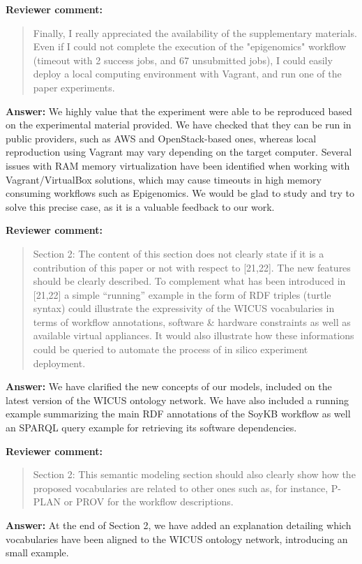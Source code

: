 \documentclass{letter}
\newenvironment{review}%
{\textbf{Reviewer comment:}\begin{quote}}%
{\end{quote}}%
\newcommand{\todo}[1]{%
      \color{red}\textbf{[TODO]} #1\color{black}}
\newcommand{\answer}[1]{%
      \textbf{Answer:} #1}
\begin{document}
\begin{letter}{}
\begin{review}
Finally, I really appreciated the availability of the supplementary materials. Even if I could not complete the execution of the "epigenomics" workflow (timeout with 2 success jobs, and 67 unsubmitted jobs), I could easily deploy a local computing environment with Vagrant, and run one of the paper experiments.
\end{review}

\answer{We highly value that the experiment were able to be reproduced based on the experimental material provided. We have checked that they can be run in public providers, such as AWS and OpenStack-based ones, whereas local reproduction using Vagrant may vary depending on the target computer. Several issues with RAM memory virtualization have been identified when working with Vagrant/VirtualBox solutions, which may cause timeouts in high memory consuming workflows such as Epigenomics. We would be glad to study and try to solve this precise case, as it is a valuable feedback to our work.}


\begin{review}
Section 2: The content of this section does not clearly state if it is a contribution of this paper or not with respect to [21,22]. The new features should be clearly described. To complement what has been introduced in [21,22] a simple ``running'' example in the form of RDF triples (turtle syntax) could illustrate the expressivity of the WICUS vocabularies in terms of workflow annotations, software \& hardware constraints as well as available virtual appliances. It would also illustrate how these informations could be queried to automate the process of in silico experiment deployment.
\end{review}

\answer{We have clarified the new concepts of our models, included on the latest version of the WICUS ontology network. We have also included a running example summarizing the main RDF annotations of the SoyKB workflow as well an SPARQL query example for retrieving its software dependencies.}



\begin{review}
Section 2: This semantic modeling section should also clearly show how the proposed vocabularies are related to other ones such as, for instance, P-PLAN or PROV for the workflow descriptions.
\end{review}

\answer{At the end of Section 2, we have added an explanation detailing which vocabularies have been aligned to the WICUS ontology network, introducing an small example.}



\end{letter}
\end{document}
